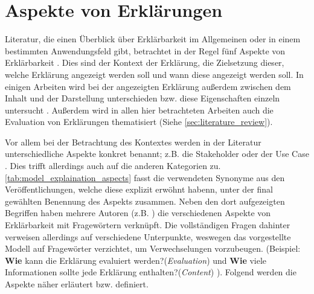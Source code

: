 \section{Aspekte von Erklärungen}
\label{sec:model_explanation_aspects}

Literatur, die einen Überblick über Erklärbarkeit im Allgemeinen oder in einem bestimmten Anwendungsfeld gibt, betrachtet in der Regel fünf Aspekte von Erklärbarkeit \cite{rosenfeld_explainability_2019, nunes_systematic_2017,chazette_knowledge_nodate}. Dies sind der Kontext der Erklärung, die Zielsetzung dieser, welche Erklärung angezeigt werden soll und wann diese angezeigt werden soll. In einigen Arbeiten wird bei der angezeigten Erklärung außerdem zwischen dem Inhalt und der Darstellung unterschieden bzw. diese Eigenschaften einzeln untersucht \cite{nunes_systematic_2017,abdulrahman_belief-based_2019}. Außerdem wird in allen hier betrachteten Arbeiten auch die Evaluation von Erklärungen thematisiert (Siehe \autoref{sec:literature_review}).

Vor allem bei der Betrachtung des Kontextes werden in der Literatur unterschiedliche Aspekte konkret benannt; z.B. die \glqq Stakeholder\grqq{} \cite{rosenfeld_explainability_2019} oder der \glqq Use Case\grqq{} \cite{waa_evaluating_2021}. Dies trifft allerdings auch auf die anderen Kategorien zu. \autoref{tab:model_explaination_aspects} fasst die verwendeten Synonyme aus den Veröffentlichungen, welche diese explizit erwöhnt habenn, unter der final gewählten Benennung des Aspekts zusammen. Neben den dort aufgezeigten Begriffen haben mehrere Autoren (z.B. \cite{rosenfeld_explainability_2019, chazette2020explainability}) die verschiedenen Aspekte von Erklärbarkeit mit Fragewörtern verknüpft. Die vollständigen Fragen dahinter verweisen allerdings auf verschiedene Unterpunkte, weswegen das vorgestellte Modell auf Fragewörter verzichtet, um Verwechselungen vorzubeugen. (Beispiel: \glqq \textbf{Wie} kann die Erklärung evaluiert werden?\grqq (\textit{Evaluation})\cite[vgl.][]{rosenfeld_explainability_2019} und \glqq \textbf{Wie} viele Informationen sollte jede Erklärung enthalten?\grqq (\textit{Content}) \cite[vgl.][]{kouki_user_2017}). Folgend werden die Aspekte näher erläutert bzw. definiert.

